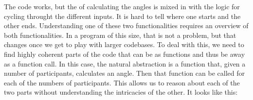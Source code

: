 The code works, but the  of calculating the angles is mixed in with the logic for cycling throught the different inputs. It is hard to tell where one starts and the other ends. Understanding one of these two functionalities requires an overview of both functionalities. In a program of this size, that is not a problem, but that changes once we get to play with larger codebases. To deal with this, we need to find highly coherent parts of the code that can be  as functions and thus be  away as a function call. In this case, the natural abstraction is a function that, given a number of participants, calculates an angle. Then that function can be called for each of the numbers of participants. This allows us to reason about each of the two parts without understanding the intricacies of the other. It looks like this:

\inputminted[linenos=true]{csharp}{../src/csharp/functions/no_guard/Program.cs}

